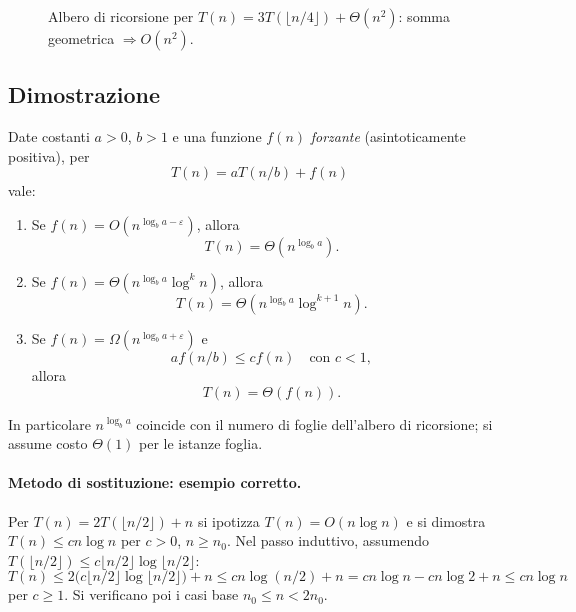 \begin{figure}[H]
	\centering
	\caption{Albero di ricorsione per $T(n)=3T(\lfloor n/4\rfloor)+\Theta(n^2)$: somma geometrica $\Rightarrow O(n^2)$.}
\end{figure}

\subsection{Dimostrazione}
\begin{teorema}
	Date costanti $a>0$, $b>1$ e una funzione $f(n)$ \emph{forzante} (asintoticamente positiva), per
	\[
	T(n)=aT(n/b)+f(n)
	\]
	vale:
	\begin{enumerate}
	\item Se $f(n)=O\!\left(n^{\log_b a-\varepsilon}\right)$, allora
	\[
	T(n)=\Theta\!\left(n^{\log_b a}\right).
	\]
	\item Se $f(n)=\Theta\!\left(n^{\log_b a}\log^k n\right)$, allora
	\[
	T(n)=\Theta\!\left(n^{\log_b a}\log^{k+1}n\right).
	\]
	\item Se $f(n)=\Omega\!\left(n^{\log_b a+\varepsilon}\right)$ e
	\[
	a f(n/b)\le c f(n)\quad\text{con }c<1,
	\]
	allora
	\[
	T(n)=\Theta(f(n)).
	\]
\end{enumerate}
In particolare $n^{\log_b a}$ coincide con il numero di foglie dell'albero di ricorsione; si assume costo $\Theta(1)$ per le istanze foglia.
\end{teorema}

\paragraph{Metodo di sostituzione: esempio corretto.}
Per $T(n)=2T(\lfloor n/2\rfloor)+n$ si ipotizza $T(n)=O(n\log n)$ e si dimostra $T(n)\le cn\log n$ per $c>0$, $n\ge n_0$.
Nel passo induttivo, assumendo $T(\lfloor n/2\rfloor)\le c\lfloor n/2\rfloor\log\lfloor n/2\rfloor$:
\[
T(n)\le 2\bigl(c\lfloor n/2\rfloor\log\lfloor n/2\rfloor\bigr)+n
\le cn\log(n/2)+n=cn\log n-cn\log 2+n\le cn\log n
\]
per $c\ge 1$. Si verificano poi i casi base $n_0\le n<2n_0$.

